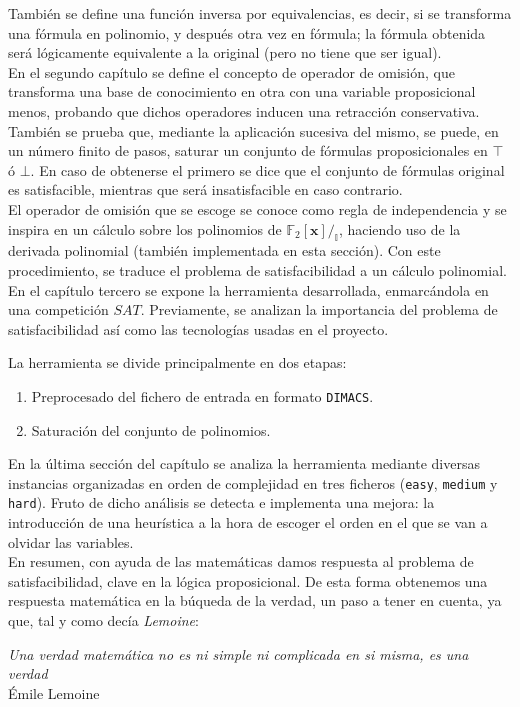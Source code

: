  También se define una función inversa por equivalencias, es decir, si se transforma una fórmula en polinomio, y después otra vez en fórmula; la fórmula obtenida será lógicamente equivalente a la original (pero no tiene que ser igual).\\

En el segundo capítulo se define el concepto de operador de omisión, que transforma una base de conocimiento en otra con una variable proposicional menos, probando que dichos operadores inducen una retracción conservativa. También se prueba que, mediante la aplicación sucesiva del mismo, se puede, en un número finito de pasos, saturar un conjunto de fórmulas proposicionales en $\top$ ó $\bot$. En caso de obtenerse el primero se dice que el conjunto de fórmulas original es satisfacible, mientras que será insatisfacible en caso contrario.\\

El operador de omisión que se escoge se conoce como regla de independencia y se inspira en un cálculo sobre los polinomios de $\mathbb{F}_2[\textbf{x}] /_{\mathbb{I}}$, haciendo uso de la derivada polinomial (también implementada en esta sección). Con este procedimiento, se traduce el problema de satisfacibilidad a un cálculo polinomial.\\

En el capítulo tercero se expone la herramienta desarrollada, enmarcándola en una competición $SAT$. Previamente, se analizan la importancia del problema de satisfacibilidad así como las tecnologías usadas en el proyecto.

\newpage

 La herramienta se divide principalmente en dos etapas: 

\begin{enumerate}
\item Preprocesado del fichero de entrada en formato \texttt{DIMACS}.
\item Saturación del conjunto de polinomios.
\end{enumerate}

En la última sección del capítulo se analiza la herramienta mediante diversas instancias organizadas en orden de complejidad en tres ficheros (\texttt{easy}, \texttt{medium} y \texttt{hard}). Fruto de dicho análisis se detecta e implementa una mejora: la introducción de una heurística a la hora de escoger el orden en el que se van a olvidar las variables.\\

En resumen, con ayuda de las matemáticas damos respuesta al problema de satisfacibilidad, clave en la lógica proposicional. De esta forma obtenemos una respuesta matemática en la búqueda de la verdad, un paso a tener en cuenta, ya que, tal y como decía \textit{Lemoine}:

\begin{center}
\textit{Una verdad matemática no es ni simple ni complicada en si misma, es una verdad}\\
\hspace{10.7cm} Émile Lemoine
\end{center}